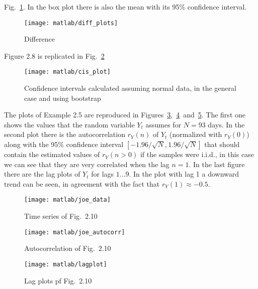 \documentclass{article}
\begin{document}
\begin{enumerate}
    Fig.~\ref{diff_plots}. In the box plot there is also the mean with
    its 95\% confidence interval.
    \begin{figure}[htbp]
    \centering
    \texttt{[image: matlab/diff\_plots]}
    \caption{Difference}
    \label{diff_plots}
    \end{figure}
    Figure 2.8 is replicated in Fig.~\ref{cis_plot}
    \begin{figure}[htbp]
    \centering
    \texttt{[image: matlab/cis\_plot]}
    \caption{Confidence intervals calculated assuming normal data, in
      the general case and using bootstrap}
    \label{cis_plot}
    \end{figure}
    
    The plots of Example 2.5 are reproduced in
    Figures~\ref{joe_data},~\ref{joe_autocorr}~and~\ref{joe_lagplot}. The
    first one shows the values that the random variable $Y_t$ assumes
    for $N = 93$ days. In the second plot there is the autocorrelation
    $r_Y(n)$ of $Y_t$ (normalized with $r_Y(0)$) along with the 95\%
    confidence interval $[-1.96/\sqrt{N}, 1.96/\sqrt{N}]$ that should
    contain the estimated values of $r_Y(n>0)$ if the samples were
    i.i.d., in this case we can see that they are very correlated when
    the lag $n=1$.  In the last figure there are the lag plots of
    $Y_t$ for lags $1\dots9$. In the plot with lag 1 a downward trend
    can be seen, in agreement with the fact that $r_Y(1) \approx
    -0.5$.
    \begin{figure}[htbp]
      \centering
      \texttt{[image: matlab/joe\_data]}
    \caption{Time series of Fig.~2.10}
    \label{joe_data}
    \end{figure}
    \begin{figure}[htbp]
      \centering
      \texttt{[image: matlab/joe\_autocorr]}
      \caption{Autocorrelation of Fig.~2.10}
    \label{joe_autocorr}
    \end{figure}
    \begin{figure}[htbp]
      \centering
      \texttt{[image: matlab/lagplot]}
    \caption{Lag plots pf Fig.~2.10}
    \label{joe_lagplot}
    \end{figure}
    

\end{enumerate}
\end{document}
